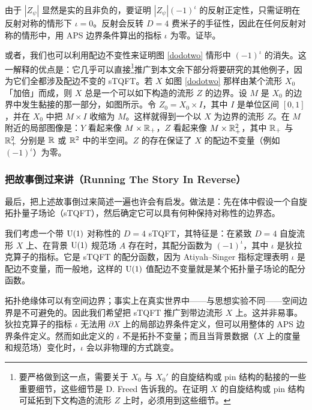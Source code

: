 由于 $|Z_\psi|$ 显然是实的且非负的，要证明 $|Z_\psi|(-1)^\iota$ 的反射正定性，只需证明在反射对称的情形下 $\iota=0$。反射会反转 $D=4$ 费米子的手征性，因此在任何反射对称的情形中，用 APS 边界条件算出的指标 $\iota$ 为零。证毕。

或者，我们也可以利用配边不变性来证明图 \ref{dodotwo} 情形中 $(-1)^\iota$ 的消失。这一解释的优点是：它几乎可以直接\footnote{要严格做到这一点，需要关于 $X_0$ 与 $X_0'$ 的自旋结构或 pin 结构的黏接的一些重要细节，这些细节是 D. Freed 告诉我的。在证明 $X$ 的自旋结构或 pin 结构可延拓到下文构造的流形 $Z$ 上时，必须用到这些细节。}推广到本文余下部分将要研究的其他例子，因为它们全都涉及配边不变的 sTQFT。若 $X$ 如图 \ref{dodotwo} 那样由某个流形 $X_0$「加倍」而成，则 $X$ 总是一个可以如下构造的流形 $Z$ 的边界。设 $M$ 是 $X_0$ 的边界中发生黏接的那一部分，如图所示。令 $Z_0=X_0\times I$，其中 $I$ 是单位区间 $[0,1]$，并在 $X_0$ 中把 $M\times I$ 收缩为 $M$。这样就得到一个以 $X$ 为边界的流形 $Z$。在 $M$ 附近的局部图像是：$Y$ 看起来像 $M\times {\mathbb{R}}_+$，$Z$ 看起来像 $M\times {\mathbb{R}}^2_+$，其中 ${\mathbb{R}}_+$ 与 ${\mathbb{R}}^2_+$ 分别是 ${\mathbb{R}}$ 或 ${\mathbb{R}}^2$ 中的半空间。$Z$ 的存在保证了 $X$ 的配边不变量（例如 $(-1)^\iota$）为零。


\subsubsection{把故事倒过来讲（Running The Story In Reverse）}\label{reverse}

最后，把上述故事倒过来简述一遍也许会有启发。做法是：先在体中假设一个自旋拓扑量子场论（sTQFT），然后确定它可以具有何种保持对称性的边界态。

我们考虑一个带 ${\mathrm U}(1)$ 对称性的 $D=4$ sTQFT，其特征是：在紧致 $D=4$ 自旋流形 $X$ 上、在背景 ${\mathrm U}(1)$ 规范场 $A$ 存在时，其配分函数为 $(-1)^\iota$，其中 $\iota$ 是狄拉克算子的指标。它是 sTQFT 的配分函数，因为 Atiyah--Singer 指标定理表明 $\iota$ 是配边不变量，而一般地，这样的 ${\mathrm U}(1)$ 值配边不变量就是某个拓扑量子场论的配分函数。

拓扑绝缘体可以有空间边界；事实上在真实世界中------与思想实验不同------空间边界是不可避免的。因此我们希望把 sTQFT 推广到带边流形 $X$ 上。这并非易事。狄拉克算子的指标 $\iota$ 无法用 $\partial X$ 上的局部边界条件定义，但可以用整体的 APS 边界条件定义。然而如此定义的 $\iota$ 不是拓扑不变量；而且当背景数据（$X$ 上的度量和规范场）变化时，$\iota$ 会以非物理的方式跳变。

